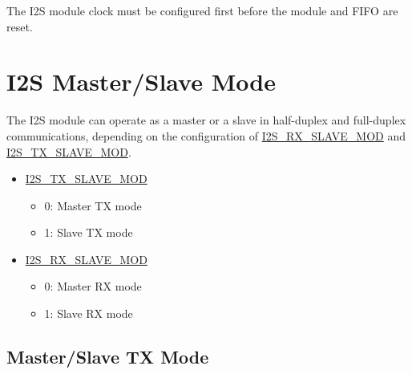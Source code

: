 \documentclass[main\_\_EN.tex]{subfiles}
\begin{document}
\begin{tiplisting}
The I2S module clock must be configured first before the module and FIFO are reset.
\end{tiplisting} 

\section{I2S Master/Slave Mode}

The \chipname{} I2S module can operate as a master or a slave in half-duplex and full-duplex communications, depending on the configuration of  \hyperref[fielddesc:I2SRXSLAVEMOD]{I2S\_RX\_SLAVE\_MOD} and  \hyperref[fielddesc:I2STXSLAVEMOD]{I2S\_TX\_SLAVE\_MOD}.

\begin{itemize}
    \item \hyperref[fielddesc:I2STXSLAVEMOD]{I2S\_TX\_SLAVE\_MOD} 
    \begin{itemize}
        \item 0: Master TX mode
        \item 1: Slave TX mode
    \end{itemize}
    \item \hyperref[fielddesc:I2SRXSLAVEMOD]{I2S\_RX\_SLAVE\_MOD}
    \begin{itemize}
        \item 0: Master RX mode
        \item 1: Slave RX mode
    \end{itemize}
\end{itemize}

\subsection{Master/Slave TX Mode} \label{sec:i2s-master-slave-tx-mode}
\end{document}
